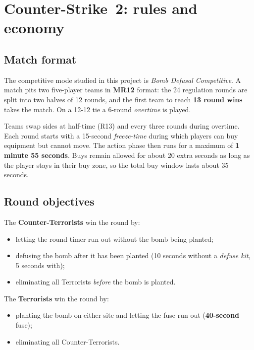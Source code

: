 
\section{Counter-Strike~2: rules and economy}
\label{annex:cs2}

\subsection{Match format}

The competitive mode studied in this project is \emph{Bomb Defusal
Competitive}. A match pits two five-player teams in \textbf{MR12}
format: the 24 regulation rounds are split into two halves of 12
rounds, and the first team to reach \textbf{13 round wins} takes the
match. On a 12-12 tie a 6-round \emph{overtime} is played.

Teams swap sides at half-time (R13) and every three rounds during
overtime. Each round starts with a 15-second \emph{freeze-time} during
which players can buy equipment but cannot move. The action phase then
runs for a maximum of \textbf{1 minute 55 seconds}. Buys remain
allowed for about 20 extra seconds as long as the player stays in
their buy zone, so the total buy window lasts about 35 seconds.

\subsection{Round objectives}

The \textcolor{cs2ct}{\textbf{Counter-Terrorists}} win the round by:
\begin{itemize}
  \item letting the round timer run out without the bomb being
    planted;
  \item defusing the bomb after it has been planted (10 seconds
    without a \emph{defuse kit}, 5 seconds with);
  \item eliminating all Terrorists \emph{before} the bomb is planted.
\end{itemize}

The \textcolor{cs2t}{\textbf{Terrorists}} win the round by:
\begin{itemize}
  \item planting the bomb on either site and letting the fuse run out
    (\textbf{40-second} fuse);
  \item eliminating all Counter-Terrorists.
\end{itemize}

